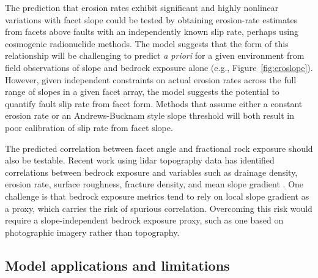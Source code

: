 The prediction that erosion rates exhibit significant and highly nonlinear variations with facet slope could be tested by obtaining erosion-rate estimates from facets above faults with an independently known slip rate, perhaps using cosmogenic radionuclide methods. The model suggests that the form of this relationship will be challenging to predict \textit{a priori} for a given environment from field observations of slope and bedrock exposure alone (e.g., Figure~\ref{fig:eroslope}). However, given independent constraints on actual erosion rates across the full range of slopes in a given facet array, the model suggests the potential to quantify fault slip rate from facet form. Methods that assume either a constant erosion rate or an Andrews-Bucknam style slope threshold will both result in poor calibration of slip rate from facet slope. %

The predicted correlation between facet angle and fractional rock exposure should also be testable. Recent work using lidar topography data has identified correlations between bedrock exposure and variables such as drainage density, erosion rate, surface roughness, fracture density, and mean slope gradient  \citep{dibiase2012hillslope,dibiase2018fracture,milodowski2015topographic,rossi2020orographic}. One challenge is that bedrock exposure metrics tend to rely on local slope gradient as a proxy, which carries the risk of spurious correlation. Overcoming this risk would require a slope-independent bedrock exposure proxy, such as one based on photographic imagery rather than topography.



\subsection{Model applications and limitations}

